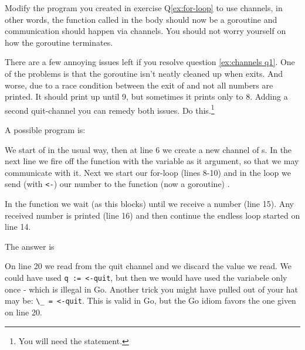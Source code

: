 \begin{Exercise}[title={Channels},difficulty=4]
\label{ex:channels}
\Question\label{ex:channels q1} Modify the program you created in
exercise Q\ref{ex:for-loop}
to use channels, in other words, the function called in the body
should now be a goroutine and communication should happen via
channels. You should not worry yourself on how the goroutine
terminates.

\Question\label{ex:channels q2} There are a few annoying issues left if
you resolve question \ref{ex:channels q1}. One of the problems is
that the goroutine isn't neatly cleaned up when 
exits. And worse, due to a race condition between the exit of 
 and  not all numbers are printed.
It should print up until 9, but sometimes it prints only to 8. Adding
a second quit-channel you can remedy both issues. Do this.\footnote{You
will need the  statement.}

\end{Exercise}

\begin{Answer}
\Question A possible program is: 

We start of in the usual way, then at line 6 we create a new channel of
s. In the next line we fire off the function  with
the  variable as it argument, so that we may communicate with
it. Next we start our for-loop (lines 8-10) and in the loop
we send (with \lstinline{<-}) our number to the function (now a goroutine) .

In the function  we wait (as this blocks) until we receive a number (line
15). Any received number is printed (line 16) and then continue the endless loop
started on line 14.

\Question The answer is

On line 20 we read from the quit channel and we discard the value we
read. We could have used \lstinline{q := <-quit}, but then we would have used
the variabele only once - which is illegal in Go. Another trick you
might have pulled out of your hat may be: \lstinline{\_ = <-quit}. This is
valid in Go, but the Go idiom favors the one given on line 20.
\end{Answer}
